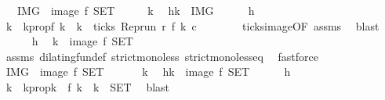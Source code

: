 \begin{isabellebody}
\ \ {\isacharparenleft}\ {\isacartoucheopen}{\isacharquery}IMG\ {\isacharequal}\ image\ f\ {\isacharquery}SET{\isacartoucheclose}{\isacharparenright}\isanewline
%
\isadelimproof
%
\endisadelimproof
%
\isatagproof
{}\isamarkupfalse%
\isanewline
\ \ \isacommand{{\isacharbraceleft}}\isamarkupfalse%
\ \isamarkupfalse%
\ k\ \isamarkupfalse%
\ h{\isacharcolon}{\isacartoucheopen}k\ {\isasymin}\ {\isacharquery}IMG{\isacartoucheclose}\isanewline
\ \ \ \ \isamarkupfalse%
\ h\ \isamarkupfalse%
\ k\ \ k{}prop{\isacharcolon}{\isacartoucheopen}f\ k\ {\isacharequal}\ k\ {\isasymand}\ ticks\ {\isacharparenleft}{\isacharparenleft}Rep{\isacharunderscore}run\ r{\isacharparenright}\ {\isacharparenleft}f\ k\ c{\isacharparenright}{\isacartoucheclose}\isanewline
\ \ \ \ \ \ \isamarkupfalse%
\ ticks{\isacharunderscore}image{\isacharbrackleft}OF\ assms{\isacharbrackright}\ \isamarkupfalse%
\ blast\isanewline
\ \ \ \ \isamarkupfalse%
\ h\ \isamarkupfalse%
\ {\isacartoucheopen}k\ {\isasymin}\ image\ f\ {\isacharquery}SET{\isacartoucheclose}\isanewline
\ \ \ \ \ \ \isamarkupfalse%
\ assms\ dilating{\isacharunderscore}fun{\isacharunderscore}def\ strict{\isacharunderscore}mono{\isacharunderscore}less\ strict{\isacharunderscore}mono{\isacharunderscore}less{\isacharunderscore}eq\ \isamarkupfalse%
\ fastforce\isanewline
\ \ \isacommand{{\isacharbraceright}}\isamarkupfalse%
\ \isamarkupfalse%
\ {\isacartoucheopen}{\isacharquery}IMG\ {\isasymsubseteq}\ image\ f\ {\isacharquery}SET{\isacartoucheclose}\ \isacommand{{\isachardot}{\isachardot}}\isamarkupfalse%
\isanewline
{}\isamarkupfalse%
\isanewline
\ \ \isacommand{{\isacharbraceleft}}\isamarkupfalse%
\ \isamarkupfalse%
\ k\ \isamarkupfalse%
\ h{\isacharcolon}{\isacartoucheopen}k\ {\isasymin}\ image\ f\ {\isacharquery}SET{\isacartoucheclose}\isanewline
\ \ \ \ \isamarkupfalse%
\ h\ \isamarkupfalse%
\ k\ \ k{}prop{\isacharcolon}{\isacartoucheopen}k\ {\isacharequal}\ f\ k\ {\isasymand}\ k\ {\isasymin}\ {\isacharquery}SET{\isacartoucheclose}\ \isamarkupfalse%
\ blast\isanewline
\ \ \ \ \isamarkupfalse%

\end{isabellebody}
